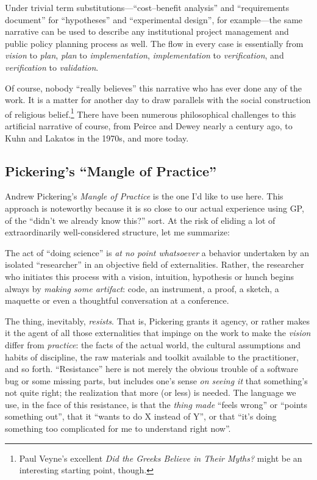 Under trivial term substitutions---``cost--benefit analysis'' and ``requirements document'' for ``hypotheses'' and ``experimental design'', for example---the same narrative can be used to describe any institutional project management and public policy planning process as well. The flow in every case is essentially from \emph{vision} to \emph{plan}, \emph{plan} to \emph{implementation}, \emph{implementation} to \emph{verification}, and \emph{verification} to \emph{validation}.

Of course, nobody ``really believes'' this narrative who has ever done any of the work. It is a matter for another day to draw parallels with the social construction of religious belief.\footnote{Paul Veyne's excellent \emph{Did the Greeks Believe in Their Myths?} might be an interesting starting point, though.} There have been numerous philosophical challenges to this artificial narrative of course, from Peirce and Dewey nearly a century ago, to Kuhn and Lakatos in the 1970s, and more today.

\subsection{Pickering's ``Mangle of Practice''}\hypertarget{pickerings-mangle-of-practice}{}\label{pickerings-mangle-of-practice}

Andrew Pickering's \emph{Mangle of Practice} is the one I'd like to use here. This approach is noteworthy because it is so close to our actual experience using GP, of the ``didn't we already know this?'' sort. At the risk of eliding a lot of extraordinarily well-considered structure, let me summarize:

The act of ``doing science'' is \emph{at no point whatsoever} a behavior undertaken by an isolated ``researcher'' in an objective field of externalities. Rather, the researcher who initiates this process with a vision, intuition, hypothesis or hunch begins always by \emph{making some artifact}: code, an instrument, a proof, a sketch, a maquette or even a thoughtful conversation at a conference.

The thing, inevitably, \emph{resists}. That is, Pickering grants it agency, or rather makes it the agent of all those externalities that impinge on the work to make the \emph{vision} differ from \emph{practice}: the facts of the actual world, the cultural assumptions and habits of discipline, the raw materials and toolkit available to the practitioner, and so forth. ``Resistance'' here is not merely the obvious trouble of a software bug or some missing parts, but includes one's sense \emph{on seeing it} that something's not quite right; the realization that more (or less) is needed. The language we use, in the face of this resistance, is that the \emph{thing made} ``feels wrong'' or ``points something out'', that it ``wants to do X instead of Y'', or that ``it's doing something too complicated for me to understand right now''.

